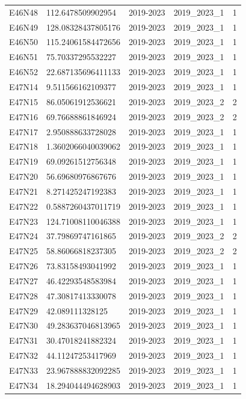 \begin{landscape}
\begin{longtable}{lllll}
E46N48 & 112.6478509902954 & 2019-2023 & 2019\_2023\_1 & 1 \\
E46N49 & 128.08328437805176 & 2019-2023 & 2019\_2023\_1 & 1 \\
E46N50 & 115.24061584472656 & 2019-2023 & 2019\_2023\_1 & 1 \\
E46N51 & 75.70337295532227 & 2019-2023 & 2019\_2023\_1 & 1 \\
E46N52 & 22.687135696411133 & 2019-2023 & 2019\_2023\_1 & 1 \\
E47N14 & 9.511566162109377 & 2019-2023 & 2019\_2023\_1 & 1 \\
E47N15 & 86.05061912536621 & 2019-2023 & 2019\_2023\_2 & 2 \\
E47N16 & 69.76688861846924 & 2019-2023 & 2019\_2023\_2 & 2 \\
E47N17 & 2.950888633728028 & 2019-2023 & 2019\_2023\_1 & 1 \\
E47N18 & 1.3602066040039062 & 2019-2023 & 2019\_2023\_1 & 1 \\
E47N19 & 69.09261512756348 & 2019-2023 & 2019\_2023\_1 & 1 \\
E47N20 & 56.69680976867676 & 2019-2023 & 2019\_2023\_1 & 1 \\
E47N21 & 8.271425247192383 & 2019-2023 & 2019\_2023\_1 & 1 \\
E47N22 & 0.5887260437011719 & 2019-2023 & 2019\_2023\_1 & 1 \\
E47N23 & 124.71008110046388 & 2019-2023 & 2019\_2023\_1 & 1 \\
E47N24 & 37.79869747161865 & 2019-2023 & 2019\_2023\_2 & 2 \\
E47N25 & 58.86066818237305 & 2019-2023 & 2019\_2023\_2 & 2 \\
E47N26 & 73.83158493041992 & 2019-2023 & 2019\_2023\_1 & 1 \\
E47N27 & 46.42293548583984 & 2019-2023 & 2019\_2023\_1 & 1 \\
E47N28 & 47.30817413330078 & 2019-2023 & 2019\_2023\_1 & 1 \\
E47N29 & 42.089111328125 & 2019-2023 & 2019\_2023\_1 & 1 \\
E47N30 & 49.283637046813965 & 2019-2023 & 2019\_2023\_1 & 1 \\
E47N31 & 30.47018241882324 & 2019-2023 & 2019\_2023\_1 & 1 \\
E47N32 & 44.11247253417969 & 2019-2023 & 2019\_2023\_1 & 1 \\
E47N33 & 23.967888832092285 & 2019-2023 & 2019\_2023\_1 & 1 \\
E47N34 & 18.294044494628903 & 2019-2023 & 2019\_2023\_1 & 1 \\

\end{longtable}
\end{landscape}
